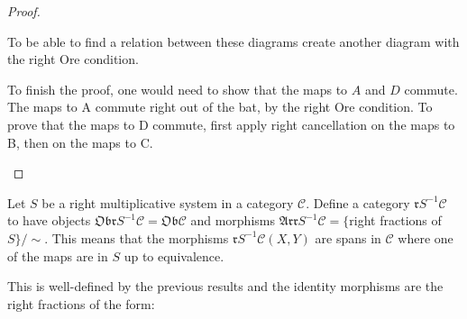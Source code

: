 \begin{proof}
\begin{center}
        \end{center}
        To be able to find a relation between these diagrams create another diagram with the right Ore condition.
        \begin{center}
            \begin{minipage}[c]{0.3\textwidth}
            \end{minipage}
            \begin{minipage}[c]{0.5\textwidth}
                To finish the proof, one would need to show that the maps to $A$ and $D$ commute. The maps to A commute right out of the bat, by the right Ore condition. To prove that the maps to D commute, first apply right cancellation on the maps to B, then on the maps to C.
            \end{minipage}
        \end{center}
    \end{proof}

    \begin{definition}
        Let $S$ be a right multiplicative system in a category $\mathcal{C}$. Define a category $\mathfrak{r}S^{-1}\mathcal{C}$ to have objects $\mathfrak{Obr}S^{-1}\mathcal{C}=\mathfrak{Ob}\mathcal{C}$ and morphisms $\mathfrak{Arr}S^{-1}\mathcal{C} = \{$right fractions of $S\}/\sim$. This means that the morphisms $\mathfrak{r}S^{-1}\mathcal{C}(X,Y)$ are spans in $\mathcal{C}$ where one of the maps are in $S$ up to equivalence.
        \begin{center}
        \end{center}
        This is well-defined by the previous results and the identity morphisms are the right fractions of the form:
        \begin{center}
        \end{center}
    \end{definition}


